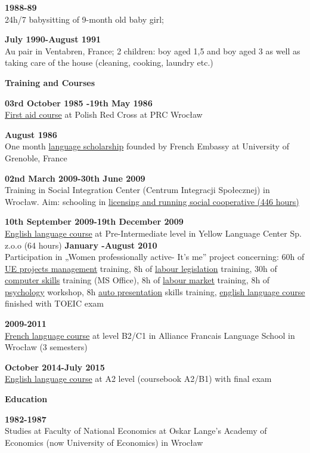 \documentclass[a4paper,12pt,final]{memoir}
\newcommand{\SmallSep}{\vspace{0.5em}}
\newenvironment{Career Profile}
	{\ignorespaces\textbf{\color{ForestGreen} Career Profile}}
	{\Sep\ignorespacesafterend}
\newenvironment{Key experience}
	{\ignorespaces\textbf{\color{ForestGreen} Key experience}}
	{\Sep\ignorespacesafterend}
\newcommand{\CVSection}[1]
	{\Large\textbf{#1}\par
	\SmallSep\normalsize\normalfont}
\newcommand{\CVItem}[1]
	{\textbf{\color{ForestGreen} #1}}
\begin{document}
\CVItem{1988-89}\\
24h/7 babysitting of 9-month old baby girl; 
\SmallSep

\CVItem{July 1990-August 1991}\\
Au pair in Ventabren, France; 2 children: boy aged 1,5 and boy aged 3 as well as taking care of the house (cleaning, cooking, laundry etc.)
\SmallSep

\CVSection{Training and Courses}
\CVItem{ 03rd October 1985 -19th May 1986}\\
\underline{First aid course} at Polish Red Cross at PRC Wrocław
\SmallSep

\CVItem{August 1986}\\
One month \underline{language scholarship} founded by French Embassy at University of Grenoble, France
\SmallSep

\CVItem{02nd March 2009-30th June 2009	}\\
Training in Social Integration Center (Centrum Integracji Społecznej) in 	Wrocław. Aim: schooling in \underline{licensing and running social cooperative (446 hours)}
\SmallSep

\CVItem{10th September 2009-19th December 2009}\\
\underline{English language course} at Pre-Intermediate level in Yellow Language Center 	Sp. z.o.o  (64 hours)
\SmallSep
\clearpage
\framebreak
\framebreak
\CVItem{January -August 2010 }\\
Participation in „Women professionally active- It's me” project concerning: 60h of \underline{UE projects management} training, 8h of \underline{labour legislation} training, 30h of \underline{computer skills} training (MS Office), 8h of \underline{labour market} training, 8h of \underline{psychology} workshop, 8h \underline{auto presentation} skills training,  \underline{english language course} finished with TOEIC exam
\SmallSep

\CVItem{2009-2011}\\
\underline{French language course} at level B2/C1 in Alliance Francais Language School in Wrocław (3 semesters)
\SmallSep

\CVItem{October 2014-July 2015}\\
\underline{English language course} at A2 level (coursebook A2/B1)
with final exam
\SmallSep

\CVSection{Education}
\CVItem{1982-1987}\\
Studies at Faculty of National Economics at Oskar Lange's Academy of Economics (now University of Economics) in Wrocław
\SmallSep
\end{document}

